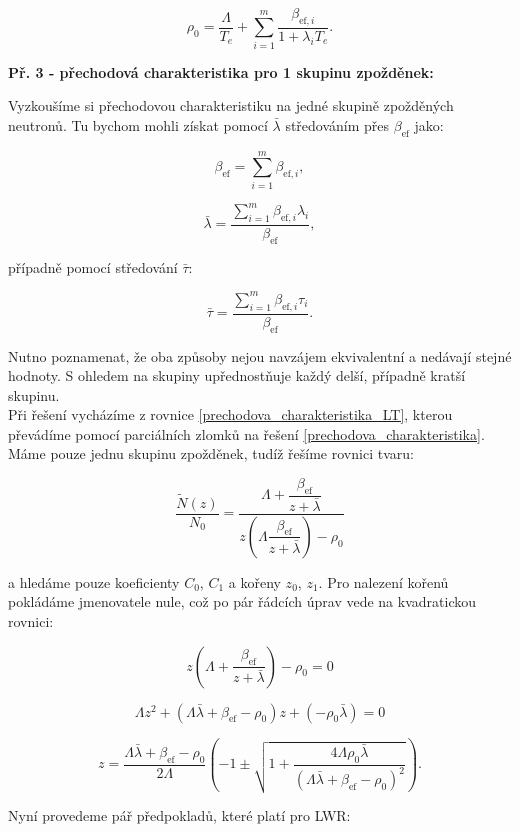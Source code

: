 \begin{equation}
  \boxed{
  \rho_0 = \dfrac{\Lambda}{T_e} + \sum_{i=1}^{m} \dfrac{\beta_{\text{ef},i}}{1 + \lambda_i T_e}.
  \label{in-hour}}
\end{equation}

\small

\textbf{Př. 3 - přechodová charakteristika pro 1 skupinu zpožděnek:}

Vyzkoušíme si přechodovou charakteristiku na jedné skupině zpožděných neutronů. Tu bychom mohli získat pomocí $\bar{\lambda}$ středováním přes $\beta_{\text{ef}}$ jako:

$$ \beta_{\text{ef}} = \sum_{i = 1}^m \beta_{\text{ef},i}, $$

$$\bar{\lambda} = \dfrac{\sum_{i=1}^m \beta_{\text{ef},i} \lambda_i}{\beta_{\text{ef}}}, $$

případně pomocí středování $\bar{\tau}$:

$$ \bar{\tau} = \dfrac{\sum_{i=1}^m \beta_{\text{ef},i} \tau_i}{\beta_{\text{ef}}}. $$

Nutno poznamenat, že oba způsoby nejou navzájem ekvivalentní a nedávají stejné hodnoty. S ohledem na skupiny upřednostňuje každý delší, případně kratší skupinu.\\

Při řešení vycházíme z rovnice \eqref{prechodova_charakteristika_LT}, kterou převádíme pomocí parciálních zlomků na řešení \eqref{prechodova_charakteristika}. Máme pouze jednu skupinu zpožděnek, tudíž řešíme rovnici tvaru:

$$ \dfrac{\tilde{N}(z)}{N_0} = \dfrac{\Lambda + \dfrac{\beta_{\text{ef}}}{z + \bar{\lambda}}}{z \left ( \Lambda \dfrac{\beta_{\text{ef}}}{z + \bar{\lambda}} \right ) - \rho_0} $$

a hledáme pouze koeficienty $C_0$, $C_1$ a kořeny $z_0$, $z_1$. Pro nalezení kořenů pokládáme jmenovatele nule, což po pár řádcích úprav vede na kvadratickou rovnici:

$$ z \left ( \Lambda + \dfrac{\beta_{\text{ef}}}{z + \bar{\lambda}} \right ) - \rho_0 = 0 $$

$$ \Lambda z^2 + (\Lambda \bar{\lambda} + \beta_{\text{ef}} - \rho_0) z + (- \rho_0 \bar{\lambda}) = 0 $$

$$ z = \dfrac{\Lambda \bar{\lambda} + \beta_{\text{ef}} - \rho_0}{2 \Lambda} \left ( -1 \pm \sqrt{1 + \dfrac{4 \Lambda \rho_0 \bar{\lambda}}{(\Lambda \bar{\lambda} + \beta_{\text{ef}} - \rho_0)^2}} \right ). $$

Nyní provedeme pář předpokladů, které platí pro LWR:

